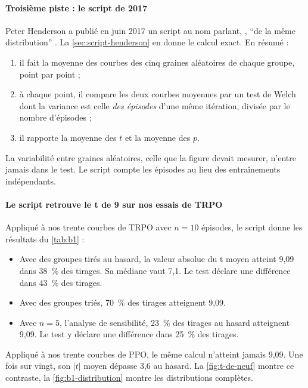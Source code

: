 \paragraph{Troisième piste : le script de 2017}
Peter Henderson a publié en juin 2017 un script au nom parlant, , \enquote{de la même
distribution} \parencite{henderson2017samedist}. La \cref{sec:script-henderson} en donne le calcul exact. En
résumé :
\begin{enumerate}
  \item il fait la moyenne des courbes des cinq graines aléatoires de chaque groupe, point par point ;
  \item à chaque point, il compare les deux courbes moyennes par un test de Welch dont la variance est celle
    \emph{des épisodes} d'une même itération, divisée par le nombre d'épisodes ;
  \item il rapporte la moyenne des $t$ et la moyenne des $p$.
\end{enumerate}
La variabilité entre graines aléatoires, celle que la figure devait mesurer, n'entre jamais dans le test. Le
script compte les épisodes au lieu des entraînements indépendants.

\paragraph{Le script retrouve le t de 9 sur nos essais de TRPO}
Appliqué à nos trente courbes de TRPO avec $n=10$ épisodes, le
script donne les résultats du \cref{tab:b1} :
\begin{itemize}
  \item Avec des groupes tirés au hasard, la valeur absolue du t moyen atteint 9,09 dans 38~\% des tirages.
    Sa médiane vaut 7,1. Le test déclare une différence dans 43~\% des tirages.
  \item Avec des groupes triés, 70~\% des tirages atteignent 9,09.
  \item Avec $n=5$, l'analyse de sensibilité, 23~\% des tirages au hasard atteignent 9,09. Le test y déclare
    une différence dans 25~\% des tirages.
\end{itemize}
Appliqué à nos trente courbes de PPO, le même calcul n'atteint jamais 9,09. Une fois sur vingt, son $|t|$
moyen dépasse 3,6 au hasard. La \cref{fig:t-de-neuf} montre ce contraste, la \cref{fig:b1-distribution}
montre les distributions complètes.


